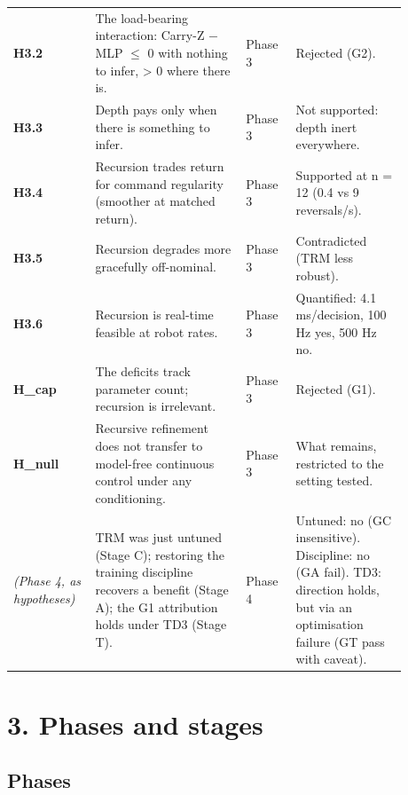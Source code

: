 \documentclass[11pt]{article}
\begin{document}
\begin{center}
\begin{tabular}{>{\raggedright\arraybackslash}p{0.161\linewidth}>{\raggedright\arraybackslash}p{0.344\linewidth}>{\raggedright\arraybackslash}p{0.115\linewidth}>{\raggedright\arraybackslash}p{0.258\linewidth}}
\textbf{H3.2} & The load-bearing interaction: Carry-Z $-$ MLP $\leq$ 0 with nothing to infer, > 0 where there is. & Phase 3 & Rejected (G2). \\
\textbf{H3.3} & Depth pays only when there is something to infer. & Phase 3 & Not supported: depth inert everywhere. \\
\textbf{H3.4} & Recursion trades return for command regularity (smoother at matched return). & Phase 3 & Supported at n = 12 (0.4 vs 9 reversals/s). \\
\textbf{H3.5} & Recursion degrades more gracefully off-nominal. & Phase 3 & Contradicted (TRM less robust). \\
\textbf{H3.6} & Recursion is real-time feasible at robot rates. & Phase 3 & Quantified: 4.1 ms/decision, 100 Hz yes, 500 Hz no. \\
\textbf{H\_cap} & The deficits track parameter count; recursion is irrelevant. & Phase 3 & Rejected (G1). \\
\textbf{H\_null} & Recursive refinement does not transfer to model-free continuous control under any conditioning. & Phase 3 & What remains, restricted to the setting tested. \\
\emph{(Phase 4, as hypotheses)} & TRM was just untuned (Stage C); restoring the training discipline recovers a benefit (Stage A); the G1 attribution holds under TD3 (Stage T). & Phase 4 & Untuned: no (GC insensitive). Discipline: no (GA fail). TD3: direction holds, but via an optimisation failure (GT pass with caveat). \\
\bottomrule
\end{tabular}\end{center}



\section*{3. Phases and stages}



\subsection*{Phases}
\end{document}
